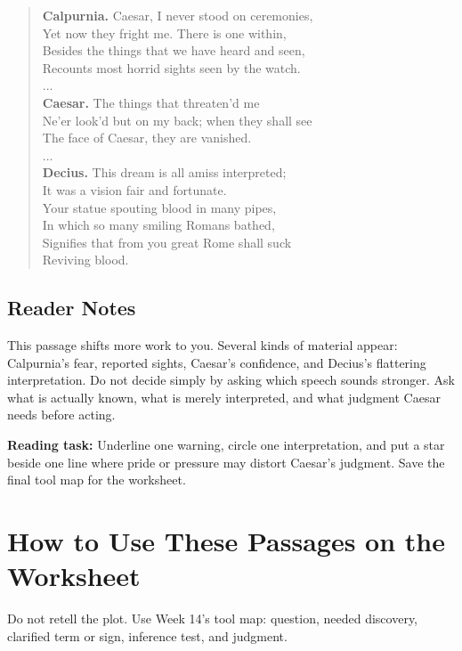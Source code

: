 \documentclass[12pt]{article}
\newenvironment{playpassage}{\begin{quote}\footnotesize\setlength{\parskip}{0.08em}\setlength{\parindent}{0pt}}{\end{quote}}
\newcommand{\speaker}[1]{\textbf{#1.}}
\begin{document}
\begin{playpassage}
\speaker{Calpurnia} Caesar, I never stood on ceremonies,\\
Yet now they fright me. There is one within,\\
Besides the things that we have heard and seen,\\
Recounts most horrid sights seen by the watch.\\
...\\
\speaker{Caesar} The things that threaten'd me\\
Ne'er look'd but on my back; when they shall see\\
The face of Caesar, they are vanished.\\
...\\
\speaker{Decius} This dream is all amiss interpreted;\\
It was a vision fair and fortunate.\\
Your statue spouting blood in many pipes,\\
In which so many smiling Romans bathed,\\
Signifies that from you great Rome shall suck\\
Reviving blood.
\end{playpassage}

\subsection*{Reader Notes}

This passage shifts more work to you. Several kinds of material appear: Calpurnia's fear, reported sights, Caesar's confidence, and Decius's flattering interpretation. Do not decide simply by asking which speech sounds stronger. Ask what is actually known, what is merely interpreted, and what judgment Caesar needs before acting.

\textbf{Reading task:} Underline one warning, circle one interpretation, and put a star beside one line where pride or pressure may distort Caesar's judgment. Save the final tool map for the worksheet.

\section*{How to Use These Passages on the Worksheet}

Do not retell the plot. Use Week 14's tool map: question, needed discovery, clarified term or sign, inference test, and judgment.
\end{document}
